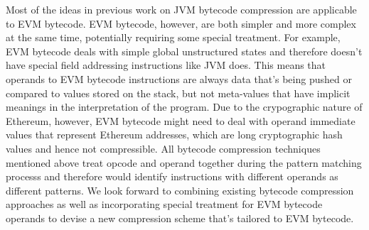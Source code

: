 Most of the ideas in previous work on JVM bytecode compression are applicable to EVM bytecode. EVM bytecode, however, are
both simpler and more complex at the same time, potentially requiring some special treatment. For example, EVM bytecode deals
with simple global unstructured states and therefore doesn't have special field addressing instructions like JVM does.
This means that operands to EVM bytecode instructions are always data that's being pushed or compared to values stored on
the stack, but not meta-values that have implicit meanings in the interpretation of the program.
Due to the crypographic nature of Ethereum, however, EVM bytecode might need to deal with operand immediate values that
represent Ethereum addresses, which are long cryptographic hash values and hence not compressible. All bytecode compression
techniques mentioned above treat opcode and operand together during the pattern matching processs and therefore would identify
instructions with different operands as different patterns.
We look forward to combining existing bytecode compression approaches as well as incorporating special treatment for EVM
bytecode operands to devise a new compression scheme that's tailored to EVM bytecode.
